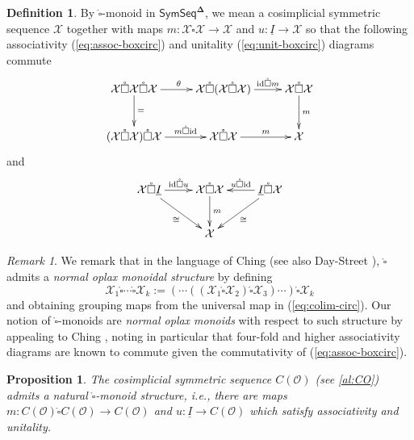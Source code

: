 \documentclass[11pt]{amsart}
\newtheorem{proposition}[subsection]{Proposition}
\theoremstyle{definition}
\newtheorem{definition}[subsection]{Definition}
\theoremstyle{remark}
\newtheorem{remark}[subsection]{Remark}
\newcommand{\SymSeq}{\mathsf{SymSeq}}
\newcommand{\id}{\mathrm{id}}
\newcommand{\Cal}[1]{\mathcal{#1}}
\newcommand{\boxcirc}{\mathring{\square}}
\newcommand{\bdel}{\mathbf{\Delta}}
\begin{document}
\begin{definition} \label{boxcirc-monoid} By $\boxcirc$-monoid in $\SymSeq^{\bdel}$, we mean a cosimplicial symmetric sequence $\Cal{X}$ together with maps $m\colon \Cal{X} \boxcirc \Cal{X} \to \Cal{X}$ and $u\colon \underline{I} \to \Cal{X}$ so that the following associativity (\ref{eq:assoc-boxcirc}) and unitality (\ref{eq:unit-boxcirc}) diagrams commute
    \begin{equation} \label{eq:assoc-boxcirc} \xymatrix{  
        \Cal{X} \boxcirc \Cal{X} \boxcirc \Cal{X} \ar[r]^{\theta} \ar[d]^-{=}&
        \Cal{X} \boxcirc (\Cal{X} \boxcirc \Cal{X}) \ar[r]^-{\id \boxcirc m} &
        \Cal{X} \boxcirc \Cal{X} \ar[d]^-{m} \\
        (\Cal{X} \boxcirc \Cal{X}) \boxcirc \Cal{X} \ar[r]^-{m \boxcirc \id} &
        \Cal{X} \boxcirc \Cal{X} \ar[r]^-{m} &
        \Cal{X}
        }\end{equation}
    and
   \begin{equation} \label{eq:unit-boxcirc} \xymatrix{ 
        \Cal{X} \boxcirc \underline{I} \ar[r]^-{\id\boxcirc u} \ar[dr]_-{\cong}
        &
        \Cal{X} \boxcirc \Cal{X} \ar[d]^-{m}
        & 
        \underline{I}\boxcirc \Cal{X} \ar[l]_-{u\boxcirc \id} \ar[dl]^-{\cong}\\
        & \Cal{X}  &
        } 
    \end{equation}
\end{definition} 

\begin{remark}
We remark that in the language of Ching \cite{Ching-oplax} (see also Day-Street \cite{Day-St}), $\boxcirc$ admits a \textit{normal oplax monoidal structure} by defining \[ \Cal{X}_1\boxcirc \cdots \boxcirc \Cal{X}_k:= (\cdots (( \Cal{X}_1 \boxcirc \Cal{X}_2) \boxcirc \Cal{X}_3) \cdots)  \boxcirc \Cal{X}_k \] and obtaining grouping maps from the universal map in (\ref{eq:colim-circ}). Our notion of $\boxcirc$-monoids are \textit{normal oplax monoids} with respect to such structure by appealing to Ching \cite[3.4]{Ching-oplax}, noting in particular that four-fold and higher associativity diagrams are known to commute given the commutativity of (\ref{eq:assoc-boxcirc}).
\end{remark}

\begin{proposition}
    \label{def:box-circ-prod-map}
    The cosimplicial symmetric sequence $C(\Cal{O})$ (see \eqref{al:CO}) admits a natural $\boxcirc$-monoid structure, i.e., there are maps $m\colon C(\Cal{O})\boxcirc C(\Cal{O})\to C(\Cal{O})$ and $u \colon \underline{I}\to C(\Cal{O})$ which satisfy associativity and unitality. 
\end{proposition}
\end{document}
